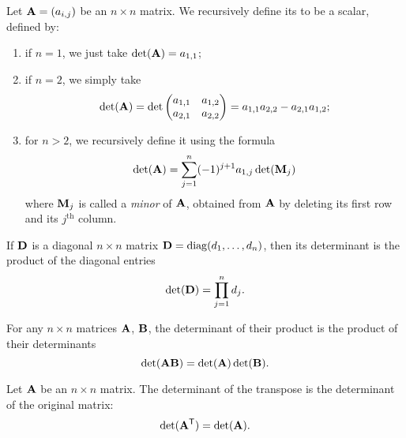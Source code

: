 \begin{definition}
Let $\mathbf{A}=(a_{i,j})$ be an $n\times n$ matrix. 
We recursively define its  to be a scalar, defined by:
\begin{enumerate}
\item if $n=1$, we just take $\det(\mathbf{A})=a_{1,1}$;
\item if $n=2$, we simply take
  \begin{equation}
    \det(\mathbf{A}) = \det\begin{pmatrix}a_{1,1} & a_{1,2}\\
    a_{2,1} & a_{2,2}
    \end{pmatrix} = a_{1,1}a_{2,2} - a_{2,1}a_{1,2};
  \end{equation}
\item for $n>2$, we recursively define it using the formula
  \begin{equation}
\det(\mathbf{A}) = \sum_{j=1}^{n}(-1)^{j+1}a_{1,j}\det(\mathbf{M}_{j})
  \end{equation}
  where $\mathbf{M}_{j}$ is called a \emph{minor} of $\mathbf{A}$, obtained
  from $\mathbf{A}$ by deleting its first row and its $j^{\text{th}}$ column.
\end{enumerate}
\end{definition}

\begin{theorem}
If $\mathbf{D}$ is a diagonal $n\times n$ matrix
$\mathbf{D}=\operatorname{diag}(d_{1},\dots,d_{n})$, then its determinant is the product
of the diagonal entries
\begin{equation}
\det(\mathbf{D}) = \prod^{n}_{j=1}d_{j}.
\end{equation}
\end{theorem}

\begin{theorem}
For any $n\times n$ matrices $\mathbf{A}$, $\mathbf{B}$,
the determinant of their product is the product of their determinants
\begin{equation}
\det(\mathbf{A}\mathbf{B}) = \det(\mathbf{A})\det(\mathbf{B}).
\end{equation}
\end{theorem}

\begin{theorem}
Let $\mathbf{A}$ be an $n\times n$ matrix.
The determinant of the transpose is the determinant of the original matrix:
\begin{equation*}
\det(\mathbf{A}^{\mathsf{T}}) = \det(\mathbf{A}).
\end{equation*}
\end{theorem}


